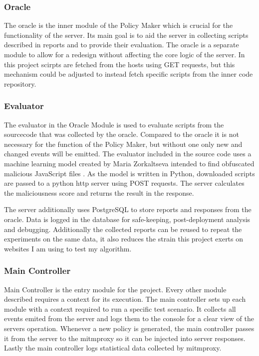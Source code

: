 \begin{description}
\subsubsection{Oracle}
The oracle is the inner module of the Policy Maker which is crucial for the functionality of the server.
Its main goal is to aid the server in collecting scripts described in reports and to provide their evaluation.
The oracle is a separate module to allow for a redesign without affecting the core logic of the server.
In this project scirpts are fetched from the hosts using GET requests, but this mechanism could be adjusted to instead fetch specific scripts from the inner code repository.

\subsubsection{Evaluator}
The evaluator in the Oracle Module is used to evaluate scripts from the sourcecode that was collected by the oracle.
Compared to the oracle it is not necessary for the function of the Policy Maker, but without one only new and changed events will be emitted.
The evaluator included in the source code uses a machine learning model created by Maria Zorkaltseva intended to find obfuscated malicious JavaScript files \cite{evaluator}.
As the model is written in Python, downloaded scripts are passed to a python http server using POST requests.
The server calculates the maliciousness score and returns the result in the response.


The server additionally uses PostgreSQL to store reports and responses from the oracle.
Data is logged in the database for safe-keeping, post-deployment analysis and debugging.
Additionally the collected reports can be reused to repeat the experiments on the same data, it also reduces the strain this project exerts on websites I am using to test my algorithm.


\subsubsection{Main Controller}
Main Controller is the entry module for the project.
Every other module described requires a context for its execution.
The main controller sets up each module with a context required to run a specific test scenario.
It collects all events emited from the server and logs them to the console for a clear view of the servers operation.
Whenever a new policy is generated, the main controller passes it from the server to the mitmproxy so it can be injected into server responses.
Lastly the main controller logs statistical data collected by mitmproxy.



\end{description}
